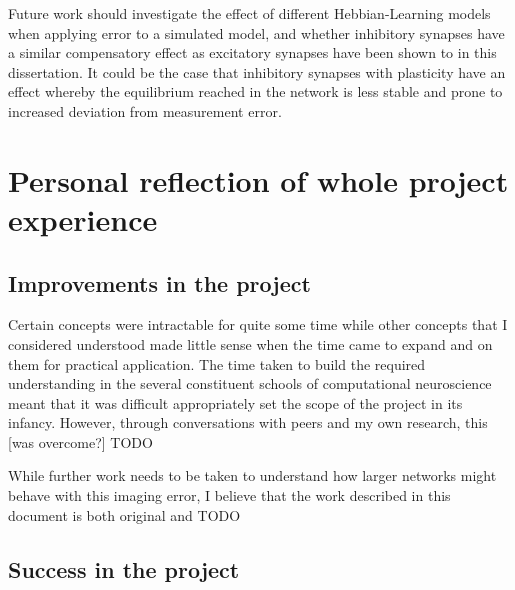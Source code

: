 Future work should investigate the effect of different Hebbian-Learning models
when applying error to a simulated model, and whether inhibitory synapses have a
similar compensatory effect as excitatory synapses have been shown to in this
dissertation. It could be the case that inhibitory synapses with plasticity have
an effect whereby the equilibrium reached in the network is less stable and
prone to increased deviation from measurement error.

\section{Personal reflection of whole project experience}
 



\subsection{Improvements in the project}

Certain concepts were intractable for quite some time while other concepts that I considered understood made little sense when the time came to
expand and on them for practical application. The time taken to build the
required understanding in the several constituent schools of computational
neuroscience meant that it was difficult appropriately set the scope of the
project in its infancy. However, through conversations with peers and my own
research, this [was overcome?] TODO

While further work needs to be taken to understand how larger networks
might behave with this imaging error, I believe that the work described in this
document is both original and TODO

\subsection{Success in the project}

